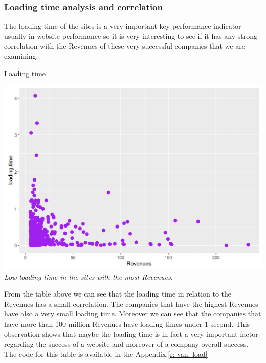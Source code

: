 \documentclass{book}
\begin{document}
\subsubsection{Loading time analysis and correlation}
The loading time of the sites is a very important key performance indicator usually in website performance so it is very interesting to see if it has any strong correlation with the Revenues of these very successful companies that we are examining.:
\begin{table}[H]
\centering
\caption{Loading time}
\begin{center}
\includegraphics[scale=0.4]{../R/photos/31_ld_rev.png}  \\
\textit{Low loading time in the sites with the most Revenues.}
\end{center}
\end{table}
From the table above we can see that the loading time in relation to the Revenues has a small correlation. The companies that have the highest Revenues have also a very small loading time. Moreover we can see that the companies that have more than 100 million Revenues have loading times under 1 second. This observation shows that maybe the loading time is in fact a very important factor regarding the success of a website and moreover of a company overall success. The code for this table is available in the Appendix.\ref{r: van: load}
\end{document}
